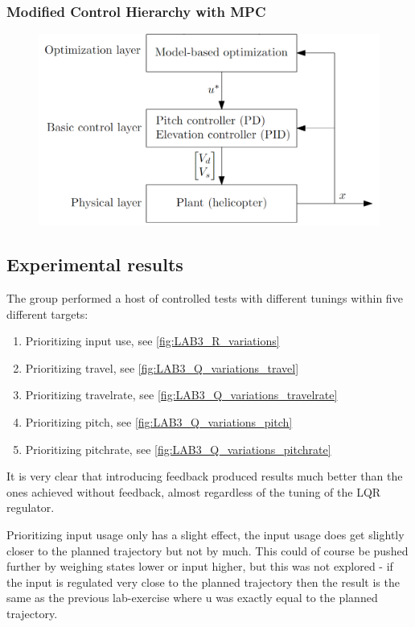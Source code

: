 \documentclass[../main.tex]{subfiles}
\begin{document}
\subsubsection{Modified Control Hierarchy with MPC}

\begin{figure}[h]
	\centering
	\includegraphics[width=0.7\linewidth]{content/MPC control hierarchy.png}
\end{figure}

\subsection{Experimental results}\label{sec:lab3_result}
The group performed a host of controlled tests with different tunings within five different targets:
\begin{enumerate}
	\item Prioritizing input use, see \cref{fig:LAB3_R_variations}
	\item Prioritizing travel, see \cref{fig:LAB3_Q_variations_travel}
	\item Prioritizing travelrate, see \cref{fig:LAB3_Q_variations_travelrate}
	\item Prioritizing pitch, see \cref{fig:LAB3_Q_variations_pitch}
	\item Prioritizing pitchrate, see \cref{fig:LAB3_Q_variations_pitchrate}
\end{enumerate}

It is very clear that introducing feedback produced results much better than the ones achieved without feedback, almost regardless of the tuning of the LQR regulator.

Prioritizing input usage only has a slight effect, the input usage does get slightly closer to the planned trajectory but not by much. This could of course be pushed further by weighing states lower or input higher, but this was not explored - if the input is regulated very close to the planned trajectory then the result is the same as the previous lab-exercise where u was exactly equal to the planned trajectory.
\end{document}
